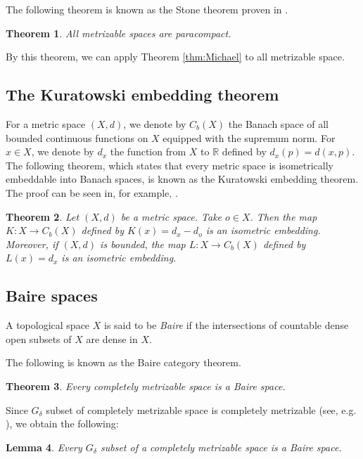 \documentclass[a4paper, 12pt]{amsart}
\theoremstyle{plain}
\newtheorem{thm}{Theorem}[section]
\newtheorem{lem}[thm]{Lemma}
\theoremstyle{definition}
\theoremstyle{remark}
\newcommand{\rr}{\mathbb{R}}
\begin{document}
The following theorem is 
known as the Stone theorem proven in  
\cite{MR0026802}. 
\begin{thm}\label{thm:Stone}
All metrizable spaces are paracompact. 
\end{thm}
By this theorem, 
we can apply Theorem 
\ref{thm:Michael} 
to all metrizable space. 






\subsection{The Kuratowski embedding theorem}
For a metric space 
$(X, d)$, 
we denote by 
$C_b(X)$ 
the Banach space of all bounded continuous functions on
 $X$ 
equipped with the supremum norm. 
For 
$x\in X$, 
we denote by 
$d_{x}$ 
the function from 
$X$ 
to 
$\rr$ 
defined by 
$d_x(p)=d(x, p)$. 
The following theorem, 
which states that every metric space
is isometrically embeddable into Banach spaces,  
is known as the Kuratowski embedding theorem. 
The proof can be seen in, for example,  
\cite[Theorem 4.3.14]{MR1039321}. 

\begin{thm}\label{thm:kur}
Let 
$(X, d)$ 
be a metric space. 
Take 
$o\in X$. 
Then 
the  map 
$K: X\to C_{b}(X)$ 
defined  by 
$K(x)=d_{x}-d_{o}$ 
is an isometric embedding. 
Moreover, 
if 
$(X, d)$ 
is bounded, 
the map 
$L\colon X\to C_{b}(X)$ 
defined by 
$L(x)=d_{x}$ 
is an isometric embedding. 
\end{thm}



\subsection{Baire spaces}
A topological space
 $X$ is said to be  
 \emph{Baire} if the intersections of 
countable dense open subsets of 
$X$ 
are dense in 
$X$. 





The following  is 
 known as the Baire category theorem. 
\begin{thm}
Every completely metrizable space is a Baire space. 
\end{thm}


Since 
$G_{\delta}$ 
subset of completely metrizable space is 
completely metrizable 
(see, e.g.  \cite[Theorem 24.12]{MR2048350}), 
we obtain the following:
\begin{lem}\label{lem:gdelta}
Every 
$G_{\delta}$ 
subset of a completely metrizable space is a Baire space. 
\end{lem}
\end{document}
